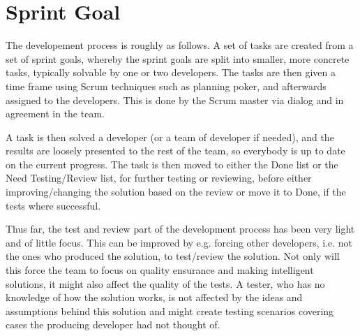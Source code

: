 \section{Sprint Goal}


The developement process is roughly as follows. A set of tasks are created from a set of sprint goals, whereby the sprint goals are split into smaller, more concrete tasks, typically solvable by one or two developers. The tasks are then given a time frame using Scrum techniques such as planning poker, and afterwards assigned to the developers. This is done by the Scrum master via dialog and in agreement in the team. 

A task is then solved a developer (or a team of developer if needed), and the results are loosely presented to the rest of the team, so everybody is up to date on the current progress. The task is then moved to either the Done list or the Need Testing/Review list, for further testing or reviewing, before either improving/changing the solution based on the review or move it to Done, if the tests where successful.

Thus far, the test and review part of the development process has been very light and of little focus. This can be improved by e.g. forcing other developers, i.e. not the ones who produced the solution, to test/review the solution. Not only will this force the team to focus on quality ensurance and making intelligent solutions, it might also affect the quality of the tests. A tester, who has no knowledge of how the solution works, is not affected by the ideas and assumptions behind this solution and might create testing scenarios covering cases the producing developer had not thought of.

